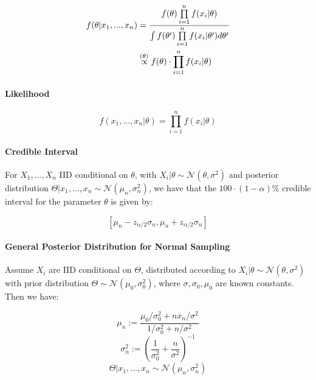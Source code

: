 \documentclass[a4paper]{article}
\begin{document}
                \begin{align*}
                    f(\theta | x_1, ..., x_n) & = \frac{f(\theta)
                        \prod\limits_{i=1}^n f(x_i | \theta)}{\int f(\theta')
                        \prod\limits_{i=1}^n f(x_i | \theta') d\theta'} \\
                    & \stackrel{({\theta})}{\propto} f(\theta) \cdot \prod_{i=1}^n f(x_i |
                        \theta)
                \end{align*}

            \paragraph{Likelihood}
                \[
                    f(x_1, ..., x_n | \theta) = \prod_{i=1}^n f(x_i | \theta)
                \]

            \paragraph{Credible Interval}
                For $X_1, ..., X_n$ IID conditional on $\theta$, with $X_i |
                \theta \sim \mathcal{N}(\theta, \sigma^2)$ and posterior
                distribution $\Theta | x_1, ..., x_n \sim \mathcal{N}(\mu_n,
                \sigma_n^2)$, we have that the $100 \cdot (1 - \alpha)\%$
                credible interval for the parameter $\theta$ is given by:

                \[
                    \left[\mu_n - z_{\alpha/2}\sigma_n, \mu_n + z_{\alpha/2}
                    \sigma_n\right]
                \]

            \paragraph{General Posterior Distribution for Normal Sampling}
                Assume $X_i$ are IID conditional on $\Theta$, distributed
                according to $X_i | \theta \sim \mathcal{N}(\theta, \sigma^2)$
                with prior distribution $\Theta \sim \mathcal{N}(\mu_0,
                \sigma_0^2)$, where $\sigma, \sigma_0, \mu_0$ are known
                constants. Then we have:

                \[
                    \mu_n := \frac{\mu_0/\sigma_0^2 + n\overline x_n/\sigma^2}
                    {1/\sigma_0^2 + n/\sigma^2}
                \]
                \[
                    \sigma_n^2 := \left(\frac{1}{\sigma_0^2} +
                    \frac{n}{\sigma^2}\right)^{-1}
                \]
                \[
                    \Theta | x_1, ..., x_n \sim \mathcal{N}(\mu_n, \sigma_n^2)
                \]
\end{document}
